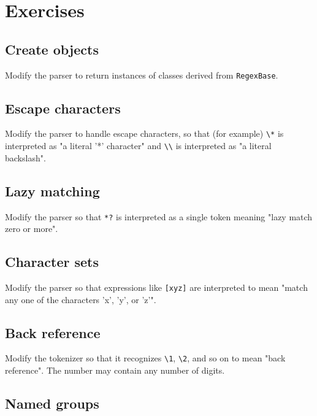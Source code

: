 \documentclass[krantzl]{krantz}
\begin{document}
\section{Exercises}\label{regex-parser-exercises}

\subsection*{Create objects}


Modify the parser to return instances of classes derived from \texttt{RegexBase}.

\subsection*{Escape characters}


Modify the parser to handle escape characters,
so that (for example) \texttt{{\textbackslash}*} is interpreted as "a literal '*' character"
and \texttt{{\textbackslash}{\textbackslash}} is interpreted as "a literal backslash".

\subsection*{Lazy matching}


Modify the parser so that \texttt{*?} is interpreted as a single token
meaning "lazy match zero or more".

\subsection*{Character sets}


Modify the parser so that expressions like \texttt{[xyz]} are interpreted to mean
"match any one of the characters 'x', 'y', or 'z'".

\subsection*{Back reference}


Modify the tokenizer so that it recognizes \texttt{{\textbackslash}1}, \texttt{{\textbackslash}2}, and so on to mean "back reference".
The number may contain any number of digits.

\subsection*{Named groups}
\end{document}
